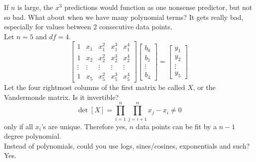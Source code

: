 \documentclass[12pt]{article}
\begin{document}
If $n$ is large, the $x^3$ predictions would function as one nonsense predictor, but not so bad. What about when we have many polynomial terms? It gets really bad, especially for values between 2 consecutive data points. \\
Let $n=5$ and $df = 4$. $$ \begin{bmatrix} 1 & x_1 & x_1^2 & x_1^3 & x_1^4 \\ 1 & x_2 & x_2^2 & x_2^3 & x_2^4 \\ \vdots & \vdots & \vdots & \vdots & \vdots \\ 1 & x_5 & x_5^2 & x_5^3 & x_5^4 \end{bmatrix} \begin{bmatrix} b_0 \\ b_1 \\ \vdots \\ b_4 \end{bmatrix} = \begin{bmatrix} y_1 \\ y_2 \\ \vdots \\ y_5 \end{bmatrix} $$ Let the four rightmost columns of the first matrix be called $X$, or the Vandermonde matrix. Is it invertible? 
$$\det[X] = \prod_{i=1}^n \prod_{j=i+1}^n x_j - x_i \neq 0 $$ 
only if all $x_i$'s are unique. Therefore yes, $n$ data points can be fit by a $n-1$ degree polynomial. \\
Instead of polynomials, could you use logs, sines/cosines, exponentials and such? Yes. 
\end{document}
